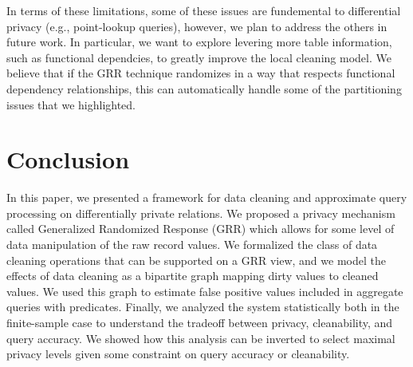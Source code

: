 \vspace{0.5em}

In terms of these limitations, some of these issues are fundemental to differential privacy (e.g., point-lookup queries), however, we plan to address the others in future work.
In particular, we want to explore levering more table information, such as functional dependcies, to greatly improve the local cleaning model.
We believe that if the GRR technique randomizes in a way that respects functional dependency relationships, this can automatically handle some of the partitioning issues that we highlighted.  

\section{Conclusion}
In this paper, we presented \sys a framework for data cleaning and approximate query processing on differentially private relations.
We proposed a privacy mechanism called Generalized Randomized Response (GRR) which allows for some level of data manipulation of the raw record values.
We formalized the class of data cleaning operations that can be supported on a GRR view, and we model the effects of data cleaning as a bipartite graph mapping dirty values to cleaned values.
We used this graph to estimate false positive values included in aggregate queries with predicates. 
Finally, we analyzed the system statistically both in the finite-sample case to understand the tradeoff between privacy, cleanability, and query accuracy.
We showed how this analysis can be inverted to select maximal privacy levels given some constraint on query accuracy or cleanability.